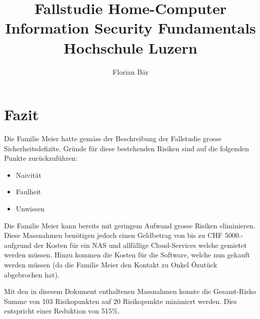 \documentclass{article}
\begin{document}
\title{%
	Fallstudie Home-Computer \\
	\large Information Security Fundamentals \\
	Hochschule Luzern}

\author{Florian Bär}
\maketitle
\thispagestyle{empty}
\clearpage
\setcounter{page}{1}

\tableofcontents



\newpage










\section{Fazit}

Die Familie Meier hatte gemäss der Beschreibung der Fallstudie grosse Sicherheitsdefizite. Gründe für diese bestehenden Risiken sind auf die folgenden Punkte zurückzuführen:
\begin{itemize}
	\item Naivität
	\item Faulheit
	\item Unwissen
\end{itemize}
Die Familie Meier kann bereits mit geringem Aufwand grosse Risiken eliminieren. Diese Massnahmen benötigen jedoch einen Geldbetrag von bis zu CHF 5000.- aufgrund der Kosten für ein NAS und allfällige Cloud-Services welche gemietet werden müssen. Hinzu kommen die Kosten für die Software, welche nun gekauft werden müssen (da die Familie Meier den Kontakt zu Onkel Özutück abgebrochen hat).

Mit den in disesem Dokument enthaltenen Massnahmen konnte die Gesamt-Risko Summe von 103 Risikopunkten auf 20 Risikopunkte minimiert werden. Dies entspricht einer Reduktion von 515\%. 
\end{document}
